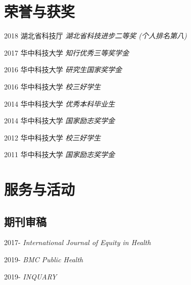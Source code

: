 \documentclass[12pt,letterpaper]{report}
\begin{document}
   
   
\section*{荣誉与获奖}

    \begin{tablist}
      
        \item[2018] \tab  湖北省科技厅  \space \textit{湖北省科技进步二等奖 (个人排名第八)}
        \item[2017] \tab  华中科技大学  \space \textit{知行优秀三等奖学金}
        \item[2016] \tab 华中科技大学  \space \textit{研究生国家奖学金}
        \item[2016] \tab 华中科技大学  \space \textit{校三好学生}
        \item[2014] \tab 华中科技大学  \space \textit{优秀本科毕业生}
        \item[2014] \tab 华中科技大学  \space \textit{国家励志奖学金}
        \item[2012] \tab 华中科技大学  \space \textit{校三好学生}
        \item[2011] \tab 华中科技大学   \space \textit{国家励志奖学金}

     \end{tablist}



        

   
\section*{服务与活动}

    \subsection*{期刊审稿}

    \begin{tablist}
    
    	 \item[2017-] \tab  \textit{International Journal of Equity in Health}
         \item[2019-] \tab   \textit{BMC Public Health}
         \item[2019-] \tab   \textit{INQUARY}
         
    \end{tablist}
	
\end{document}
